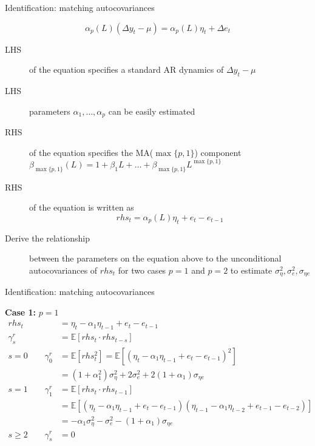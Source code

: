 \documentclass[notes,blackandwhite,mathsans,usenames,dvipsnames]{beamer}
\begin{document}
\begin{frame}{Identification: matching autocovariances}

$$
\alpha_p(L)(\Delta y_t - \mu) = \alpha_p(L)\eta_t + \Delta e_t
$$

\begin{description}
\item[LHS] {\color{mcxs2}of the equation specifies a standard AR dynamics of} $\Delta y_t - \mu$
\item[LHS] {\color{mcxs2}parameters} $\alpha_1,\dots,\alpha_p$ {\color{mcxs2}can be easily estimated}
\item[RHS] {\color{mcxs2}of the equation specifies the MA($\max\{p,1\}$) component}
$\beta_{\max\{p,1\}}(L) = 1+\beta_1L + \dots + \beta_{\max\{p,1\}}L^{\max\{p,1\}}$
\item[RHS] {\color{mcxs2}of the equation is written as}
$$ rhs_t = \alpha_p(L)\eta_t + e_t - e_{t-1} $$
\item[Derive the relationship] {\color{mcxs2}between the parameters on the equation above to the unconditional autocovariances of} $rhs_t$ {\color{mcxs2}for two cases} $p=1$ {\color{mcxs2}and} $p=2$ {\color{mcxs2}to estimate} $\sigma_\eta^2,\sigma_e^2,\sigma_{\eta e}$
\end{description}

\end{frame}






\begin{frame}{Identification: matching autocovariances}

\textbf{Case 1:} $p=1$ \scriptsize
\begin{align*}
rhs_t &= \eta_t - \alpha_1 \eta_{t-1} + e_t - e_{t-1}\\[3ex]
\gamma_s^r &= \mathbb{E}[rhs_t \cdot rhs_{t-s}]\\[3ex]
s=0 \qquad \gamma_0^r &= \mathbb{E}\left[rhs_t ^2\right] = \mathbb{E}\left[(\eta_t - \alpha_1 \eta_{t-1} + e_t - e_{t-1})^2\right]\\
&= \left(1+\alpha_1^2\right)\sigma^2_\eta + 2\sigma^2_e + 2\left(1+\alpha_1\right)\sigma_{\eta e}\\[3ex]
s=1 \qquad \gamma_1^r &= \mathbb{E}\left[rhs_t \cdot rhs_{t-1}\right] \\
&= \mathbb{E}\left[(\eta_t - \alpha_1 \eta_{t-1} + e_t - e_{t-1})(\eta_{t-1} - \alpha_1 \eta_{t-2} + e_{t-1} - e_{t-2})\right]\\
&= -\alpha_1\sigma^2_\eta -\sigma^2_e -\left(1+\alpha_1\right)\sigma_{\eta e}\\[3ex]
s\geq 2 \qquad \gamma_s^r &=0
\end{align*}

\end{frame}
\end{document}
